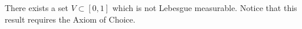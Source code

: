 \documentclass[12pt]{article}
\begin{document}
There exists a set $V\subset [0,1]$ which is not Lebesgue measurable. 
Notice that this result requires the Axiom of Choice.
\end{document}
